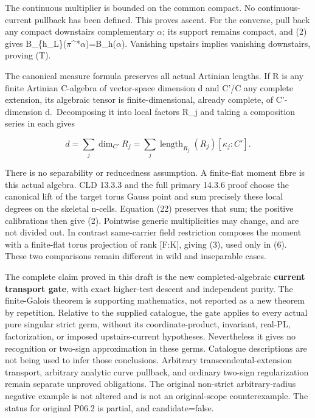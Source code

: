 \documentclass[
  10pt,
]{article}
\begin{document}
The continuous multiplier is bounded on the common compact. No
continuous-current pullback has been defined. This proves ascent. For
the converse, pull back any compact downstairs complementary \ensuremath{\alpha}; its
support remains compact, and (2) gives B\_\{h\_L\}(\ensuremath{\pi}\^{}*\ensuremath{\alpha})=B\_h(\ensuremath{\alpha}).
Vanishing upstairs implies vanishing downstairs, proving (T).

The canonical measure formula preserves all actual Artinian lengths. If
R is any finite Artinian C-algebra of vector-space dimension d and C'/C
any complete extension, its algebraic tensor is finite-dimensional,
already complete, of C'-dimension d.~Decomposing it into local factors
R\_j and taking a composition series in each gives

\[
 d=\sum_j\dim_{C'}R_j
   =\sum_j\operatorname{length}_{R_j}(R_j)[\kappa_j:C'].      \tag{22}
\]

There is no separability or reducedness assumption. A finite-flat moment
fibre is this actual algebra. CLD 13.3.3 and the full primary 14.3.6
proof choose the canonical lift of the target torus Gauss point and sum
precisely these local degrees on the skeletal n-cells. Equation (22)
preserves that sum; the positive calibrations then give (2). Pointwise
generic multiplicities may change, and are not divided out. In contrast
same-carrier field restriction composes the moment with a finite-flat
torus projection of rank {[}F:K{]}, giving (3), used only in (6). These
two comparisons remain different in wild and inseparable cases.

The complete claim proved in this draft is the new completed-algebraic
\textbf{current transport gate}, with exact higher-test descent and
independent purity. The finite-Galois theorem is supporting mathematics,
not reported as a new theorem by repetition. Relative to the supplied
catalogue, the gate applies to every actual pure singular strict germ,
without its coordinate-product, invariant, real-PL, factorization, or
imposed upstairs-current hypotheses. Nevertheless it gives no
recognition or two-sign approximation in these germs. Catalogue
descriptions are not being used to infer those conclusions. Arbitrary
transcendental-extension transport, arbitrary analytic curve pullback,
and ordinary two-sign regularization remain separate unproved
obligations. The original non-strict arbitrary-radius negative example
is not altered and is not an original-scope counterexample. The status
for original P06.2 is partial, and candidate=false.
\end{document}
